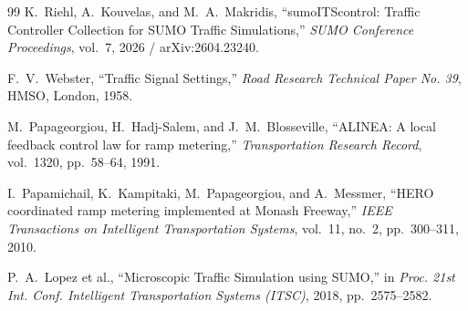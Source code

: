 \documentclass[journal,twocolumn]{IEEEtran}
\begin{document}
\begin{thebibliography}{99}
K.~Riehl, A.~Kouvelas, and M.~A.~Makridis, ``sumoITScontrol: Traffic Controller Collection for SUMO Traffic Simulations,'' \emph{SUMO Conference Proceedings}, vol.~7, 2026 / arXiv:2604.23240.

F.~V.~Webster, ``Traffic Signal Settings,'' \emph{Road Research Technical Paper No. 39}, HMSO, London, 1958.

M.~Papageorgiou, H.~Hadj-Salem, and J.~M.~Blosseville, ``ALINEA: A local feedback control law for ramp metering,'' \emph{Transportation Research Record}, vol.~1320, pp.~58--64, 1991.

I.~Papamichail, K.~Kampitaki, M.~Papageorgiou, and A.~Messmer, ``HERO coordinated ramp metering implemented at Monash Freeway,'' \emph{IEEE Transactions on Intelligent Transportation Systems}, vol.~11, no.~2, pp.~300--311, 2010.

P.~A.~Lopez et al., ``Microscopic Traffic Simulation using SUMO,'' in \emph{Proc. 21st Int. Conf. Intelligent Transportation Systems (ITSC)}, 2018, pp.~2575--2582.
\end{thebibliography}
\end{document}
